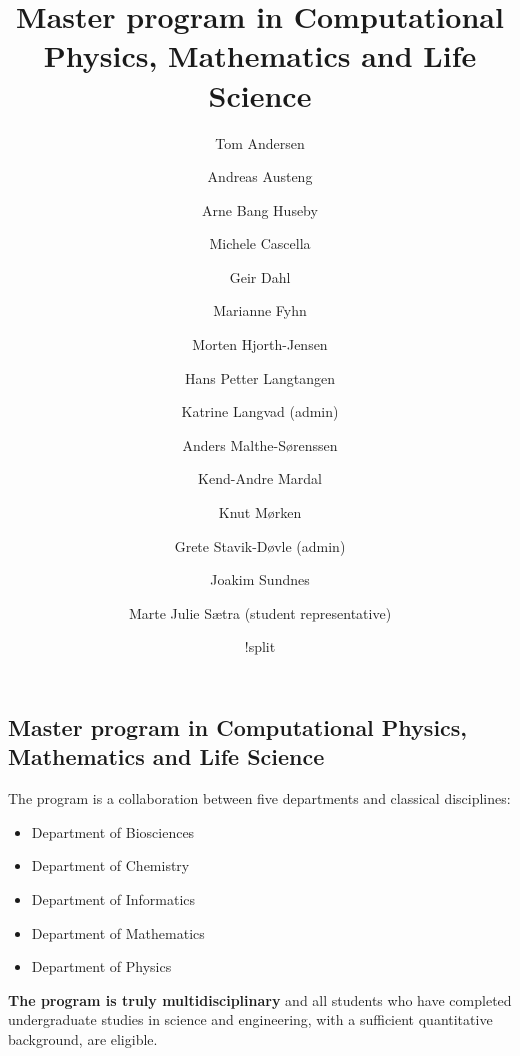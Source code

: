 \documentclass[%
oneside,                 %
final,                   %
10pt]{article}
\begin{document}






\title{Master program in Computational Physics, Mathematics and Life Science}


\author{Tom Andersen
\and
Andreas Austeng
\and
Arne Bang Huseby
\and
Michele Cascella
\and
Geir Dahl
\and
Marianne Fyhn
\and
Morten Hjorth-Jensen
\and
Hans Petter Langtangen
\and
Katrine Langvad (admin)
\and
Anders Malthe-Sørenssen
\and
Kend-Andre Mardal
\and
Knut Mørken
\and
Grete Stavik-Døvle (admin)
\and
Joakim Sundnes
\and
Marte Julie Sætra (student representative)}


\date{!split
}

\subsection{Master program in Computational Physics, Mathematics and Life Science}
\begin{block}{}

The program is a collaboration between five departments and classical disciplines:

\begin{itemize}
 \item Department of Biosciences

 \item Department of Chemistry

 \item Department of Informatics

 \item Department of Mathematics

 \item Department of Physics
\end{itemize}

\noindent
\textbf{The program is truly multidisciplinary} and all students who have completed
undergraduate studies in science and engineering, with a sufficient
quantitative background, are eligible.  

\end{block}
\end{document}
